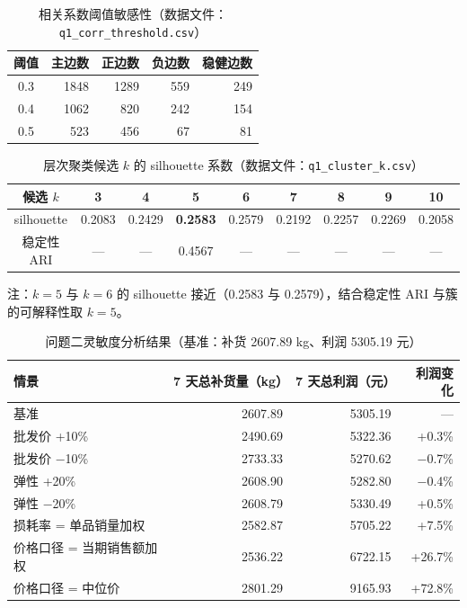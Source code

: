 
\begin{table}[htbp]
\centering
\caption{相关系数阈值敏感性（数据文件：\texttt{q1\_corr\_threshold.csv}）}
\label{tab:threshold}
\begin{tabular}{c r r r r}
\toprule
阈值 & 主边数 & 正边数 & 负边数 & 稳健边数 \\
\midrule
0.3 & 1848 & 1289 & 559 & 249 \\
0.4 & 1062 & 820  & 242 & 154 \\
0.5 & 523  & 456  & 67  & 81  \\
\bottomrule
\end{tabular}
\end{table}

\begin{table}[htbp]
\centering
\caption{层次聚类候选 $k$ 的 silhouette 系数（数据文件：\texttt{q1\_cluster\_k.csv}）}
\label{tab:silhouette}
\begin{tabular}{c c c c c c c c c}
\toprule
候选 $k$ & 3 & 4 & 5 & 6 & 7 & 8 & 9 & 10 \\
\midrule
silhouette & 0.2083 & 0.2429 & \textbf{0.2583} & 0.2579 & 0.2192 & 0.2257 & 0.2269 & 0.2058 \\
稳定性 ARI & --- & --- & 0.4567 & --- & --- & --- & --- & --- \\
\bottomrule
\end{tabular}
\par\medskip\footnotesize 注：$k=5$ 与 $k=6$ 的 silhouette 接近（0.2583 与 0.2579），结合稳定性 ARI 与簇的可解释性取 $k=5$。
\end{table}

\begin{table}[htbp]
\centering
\caption{问题二灵敏度分析结果（基准：补货 2607.89 kg、利润 5305.19 元）}
\label{tab:q2_sensitivity}
\begin{tabular}{l r r r}
\toprule
情景 & 7 天总补货量（kg） & 7 天总利润（元） & 利润变化 \\
\midrule
基准 & 2607.89 & 5305.19 & --- \\
批发价 +10\% & 2490.69 & 5322.36 & +0.3\% \\
批发价 −10\% & 2733.33 & 5270.62 & −0.7\% \\
弹性 +20\% & 2608.90 & 5282.80 & −0.4\% \\
弹性 −20\% & 2608.79 & 5330.49 & +0.5\% \\
损耗率 = 单品销量加权 & 2582.87 & 5705.22 & +7.5\% \\
价格口径 = 当期销售额加权 & 2536.22 & 6722.15 & +26.7\% \\
价格口径 = 中位价 & 2801.29 & 9165.93 & +72.8\% \\
\bottomrule
\end{tabular}
\end{table}

